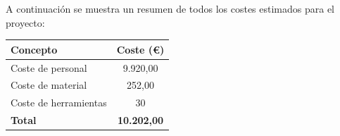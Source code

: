 A continuación se muestra un resumen de todos los costes estimados para el proyecto:

\begin{center}
\begin{tabular}{|l|c|}
\hline
\textbf{Concepto} & \textbf{Coste (€)} \\
\hline
Coste de personal & 9.920,00 \\
Coste de material & 252,00 \\
Coste de herramientas & 30 \\
\hline
\textbf{Total} & \textbf{10.202,00} \\
\hline
\end{tabular}
\end{center}